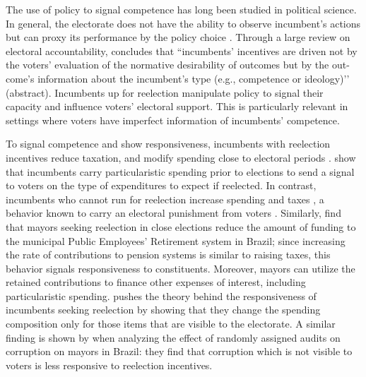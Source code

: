 \documentclass[12pt]{amsart}
\numberwithin{equation}{section}
\theoremstyle{definition}
\theoremstyle{definition}
\theoremstyle{definition}
\begin{document}
The use of policy to signal competence has long been studied in political science. In general, the electorate does not have the ability to observe incumbent’s actions but can proxy its performance by the policy choice \citep{ferejohn_1986}. Through a large review on electoral accountability, \citet{ashworth_2012} concludes that ``incumbents’ incentives are driven not by the voters’ evaluation of the normative desirability of outcomes but by the out- come’s information about the incumbent’s type (e.g., competence or ideology)’’ (abstract). Incumbents up for reelection manipulate policy to signal their capacity and influence voters’ electoral support. This is particularly relevant in settings where voters have imperfect information of incumbents’ competence.%

To signal competence and show responsiveness, incumbents with reelection incentives reduce taxation, and modify spending close to electoral periods \citep{Rogoff_1988, Rogoff_1990, klein_sakurai_2015}. \citet{Drazen_eslava_2005} show that incumbents carry particularistic spending prior to elections to send a signal to voters on the type of expenditures to expect if reelected. In contrast, incumbents who cannot run for reelection increase spending and taxes \citep{Besley_case_1995}, a behavior known to carry an electoral punishment from voters \citep{peltzman_1992}. Similarly, \citet{Schettini_2020} find that mayors seeking reelection in close elections reduce the amount of funding to the municipal Public Employees’ Retirement system in Brazil; since increasing the rate of contributions to pension systems is similar to raising taxes, this behavior signals responsiveness to constituents. Moreover, mayors can utilize the retained contributions to finance other expenses of interest, including particularistic spending. \citet{akhmedov_2004} pushes the theory behind the responsiveness of incumbents seeking reelection by showing that they change the spending composition only for those items that are visible to the electorate. A similar finding is shown by \citet{ferraz_finan_2011} when analyzing the effect of randomly assigned audits on corruption on mayors in Brazil: they find that corruption which is not visible to voters is less responsive to reelection incentives.
\end{document}
